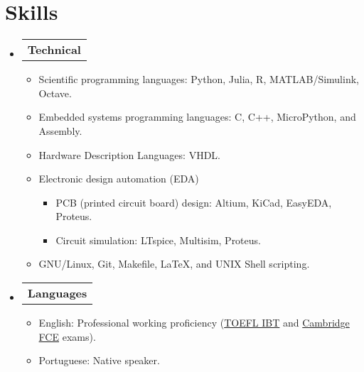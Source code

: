 \section{Skills}

\begin{itemize}[leftmargin=0.15in, label={}] %
  \item   \begin{tabular*}{0.2\textwidth}{l} \textbf{Technical} \end{tabular*}\vspace{-7pt} %
          \begin{itemize} %
            \item Scientific programming languages: Python, Julia, R, MATLAB/Simulink, Octave.
            \item Embedded systems programming languages: C, C++, MicroPython, and Assembly. %
            \item Hardware Description Languages: VHDL.
            \item Electronic design automation (EDA)
            \begin{itemize}[label=\(\triangleright\)]
                \item PCB (printed circuit board) design: Altium, KiCad, EasyEDA, Proteus.
                \item Circuit simulation: LTspice, Multisim, Proteus.
            \end{itemize}
            \item GNU/Linux, Git, Makefile, \LaTeX, and UNIX Shell scripting.
          \end{itemize}\vspace{-5pt}
  \item   \begin{tabular*}{0.2\textwidth}{l} \textbf{Languages} \end{tabular*}\vspace{-6pt} %
          \begin{itemize}
            \item English: Professional working proficiency (\href{https://github.com/tapyu/tapyu/blob/master/cv/Latex/figs/Toefl.pdf}{TOEFL IBT} and \href{https://github.com/tapyu/tapyu/blob/master/cv/Latex/figs/Cambridge\%20FCE.pdf}{Cambridge FCE} exams).
            \item Portuguese: Native speaker.
          \end{itemize}
\end{itemize} %